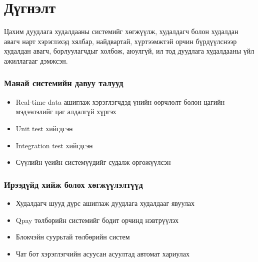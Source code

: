 \chapter{Дүгнэлт}
\label{Conclusion}
\newpage
Цахим дуудлага худалдааны системийг хөгжүүлж, худалдагч болон худалдан авагч нарт хэрэглэхэд хялбар, найдвартай, хүртээмжтэй орчин бүрдүүлснээр худалдан авагч, борлуулагчдыг холбож, аюулгүй, ил тод дуудлага худалдааны үйл ажиллагааг дэмжсэн.
\subsection{Манай системийн давуу талууд}
    \begin{itemize}
    \item Real-time data ашиглаж хэрэглэгчдэд үнийн өөрчлөлт болон цагийн мэдээлэлийг цаг алдалгүй хүргэх
    \item Unit test хийгдсэн 
    \item Integration test хийгдсэн
    \item Сүүлийн үеийн системүүдийг судалж өргөжүүлсэн
\end{itemize}
\subsection{Ирээдүйд хийж болох хөгжүүлэлтүүд}
    \begin{itemize}
    \item Худалдагч шууд дүрс ашиглаж дуудлага худалдааг явуулах
    \item Qpay төлбөрийн системийг бодит орчинд нэвтрүүлэх
    \item Блокчэйн суурьтай төлбөрийн систем
    \item Чат бот хэрэглэгчийн асуусан асуултад автомат хариулах
\end{itemize}